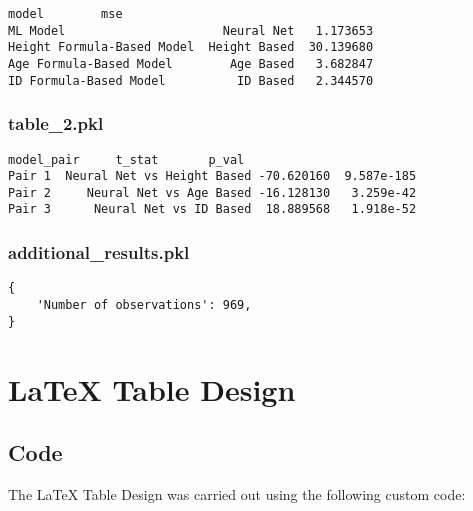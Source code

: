 \documentclass[11pt]{article}
\begin{document}
\begin{Verbatim}[tabsize=4]
                                   model        mse
ML Model                      Neural Net   1.173653
Height Formula-Based Model  Height Based  30.139680
Age Formula-Based Model        Age Based   3.682847
ID Formula-Based Model          ID Based   2.344570
\end{Verbatim}

\subsubsection*{table\_2.pkl}

\begin{Verbatim}[tabsize=4]
                        model_pair     t_stat       p_val
Pair 1  Neural Net vs Height Based -70.620160  9.587e-185
Pair 2     Neural Net vs Age Based -16.128130   3.259e-42
Pair 3      Neural Net vs ID Based  18.889568   1.918e-52
\end{Verbatim}

\subsubsection*{additional\_results.pkl}

\begin{Verbatim}[tabsize=4]
{
    'Number of observations': 969,
}
\end{Verbatim}

\section{LaTeX Table Design}
\subsection{{Code}}
The LaTeX Table Design was carried out using the following custom code:
\end{document}
